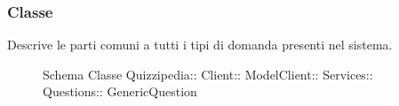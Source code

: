 \subsubsection{Classe }
Descrive le parti comuni a tutti i tipi di domanda presenti nel sistema.
\begin{figure}[H]
\centering
\noindent{}
\caption[Schema Classe GenericQuestion]{Schema Classe Quizzipedia:: Client:: ModelClient:: Services:: Questions:: GenericQuestion}
\end{figure}
